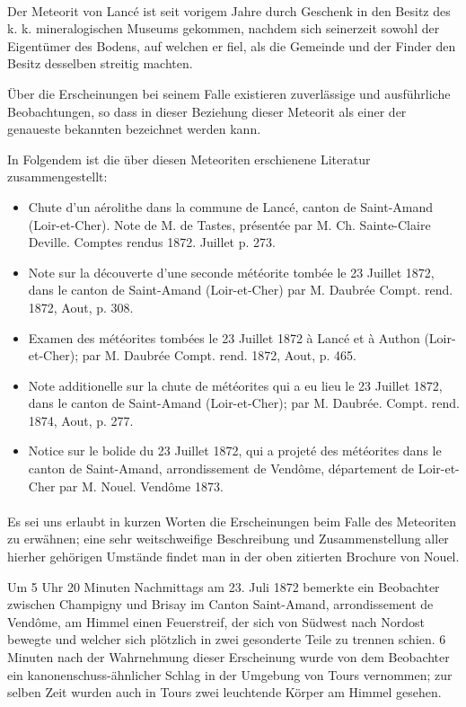 \documentclass[a4paper, 11pt, oneside]{article}
\begin{document}
\paragraph{}
Der Meteorit von Lancé ist seit vorigem Jahre durch Geschenk in den Besitz des k. k. mineralogischen Museums gekommen, nachdem sich seinerzeit sowohl der Eigentümer des Bodens, auf welchen er fiel, als die Gemeinde und der Finder den Besitz desselben streitig machten.

Über die Erscheinungen bei seinem Falle existieren zuverlässige und ausführliche Beobachtungen, so dass in dieser Beziehung dieser Meteorit als einer der genaueste bekannten bezeichnet werden kann.

In Folgendem ist die über diesen Meteoriten erschienene Literatur zusammengestellt:
\large
\begin{itemize}
    \item Chute d’un aérolithe dans la commune de Lancé, canton de Saint-Amand (Loir-et-Cher). Note de M. de Tastes, présentée par M. Ch. Sainte-Claire Deville. Comptes rendus 1872. Juillet p. 273.
    \item Note sur la découverte d’une seconde météorite tombée le 23 Juillet 1872, dans le canton de Saint-Amand (Loir-et-Cher) par M. Daubrée Compt. rend. 1872, Aout, p. 308.
    \item Examen des météorites tombées le 23 Juillet 1872 à Lancé et à Authon (Loir-et-Cher); par M. Daubrée Compt. rend. 1872, Aout, p. 465.
    \item Note additionelle sur la chute de météorites qui a eu lieu le 23 Juillet 1872, dans le canton de Saint-Amand (Loir-et-Cher); par M. Daubrée. Compt. rend. 1874, Aout, p. 277.
    \item Notice sur le bolide du 23 Juillet 1872, qui a projeté des météorites dans le canton de Saint-Amand, arrondissement de Vendôme, département de Loir-et-Cher par M. Nouel. Vendôme 1873.
\end{itemize}
\LARGE
\paragraph{}
Es sei uns erlaubt in kurzen Worten die Erscheinungen beim Falle des Meteoriten zu erwähnen; eine sehr weitschweifige Beschreibung und Zusammenstellung aller hierher gehörigen Umstände findet man in der oben zitierten Brochure von Nouel.

Um 5 Uhr 20 Minuten Nachmittags am 23. Juli 1872 bemerkte ein Beobachter zwischen Champigny und Brisay im Canton Saint-Amand, arrondissement de Vendôme, am Himmel einen Feuerstreif, der sich von Südwest nach Nordost bewegte und welcher sich plötzlich in zwei gesonderte Teile zu trennen schien. 6 Minuten nach der Wahrnehmung dieser Erscheinung wurde von dem Beobachter ein kanonenschuss-ähnlicher Schlag in der Umgebung von Tours vernommen; zur selben Zeit wurden auch in Tours zwei leuchtende Körper am Himmel gesehen.
\end{document}

